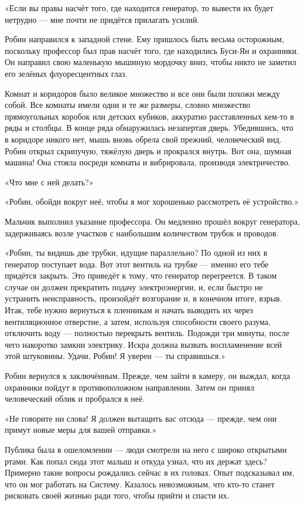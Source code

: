 \documentclass[a5paper, 9pt,
final, openany, twoside=true]{memoir}
\begin{document}
«Если вы правы насчёт того, где находится генератор, то вывести их будет нетрудно — мне почти не придётся прилагать усилий.\bigskip

Робин направился к западной стене. Ему пришлось быть весьма осторожным, поскольку профессор был прав насчёт того, где находились Буси-Ян и охранники. Он направил свою маленькую мышиную мордочку вниз, чтобы никто не заметил его зелёных флуоресцентных глаз.

Комнат и коридоров было великое множество и все они были похожи между собой. Все комнаты имели одни и те же размеры, словно множество прямоугольных коробок или детских кубиков, аккуратно расставленных кем-то в ряды и столбцы. В конце ряда обнаружилась незапертая дверь. Убедившись, что в коридоре никого нет, мышь вновь обрела свой прежний, человеческий вид. Робин открыл скрипучую, тяжёлую дверь и прокрался внутрь. Вот она, шумная машина! Она стояла посреди комнаты и вибрировала, производя электричество.

«Что мне с ней делать?»

«Робин, обойди вокруг неё, чтобы я мог хорошенько рассмотреть её устройство.»

Мальчик выполнил указание профессора. Он медленно прошёл вокруг генератора, задерживаясь возле участков с наибольшим количеством трубок и проводов.

«Робин, ты видишь две трубки, идущие параллельно? По одной из них в генератор поступает вода. Вот этот вентиль на трубке — именно его тебе придётся закрыть. Это приведёт к тому, что генератор перегреется. В таком случае он должен прекратить подачу электроэнергии, и, если быстро не устранить неисправность, произойдёт возгорание и, в конечном итоге, взрыв. Итак, тебе нужно вернуться к пленникам и начать выводить их через вентиляционное отверстие, а затем, используя способности своего разума, отключить воду — полностью перекрыть вентиль. Подожди три минуты, после чего накоротко замкни электрику. Искра должна вызвать воспламенение всей этой штуковины. Удачи, Робин! Я уверен — ты справишься.»\bigskip

Робин вернулся к заключённым. Прежде, чем зайти в камеру, он выждал, когда охранники пойдут в противоположном направлении. Затем он принял человеческий облик и пробрался в неё.

«Не говорите ни слова! Я должен вытащить вас отсюда — прежде, чем они примут новые меры для вашей отправки.»

Публика была в ошеломлении — люди смотрели на него с широко открытыми ртами. Как попал сюда этот малыш и откуда узнал, что их держат здесь? Примерно такие вопросы рождались сейчас в их головах. Опыт подсказывал им, что он мог работать на Систему. Казалось невозможным, что кто-то станет рисковать своей жизнью ради того, чтобы прийти и спасти их.
\end{document}
